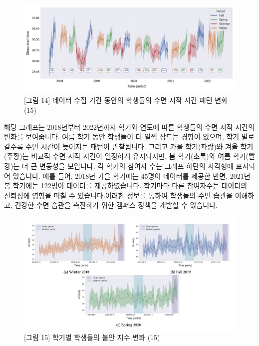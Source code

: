 \documentclass[
  letterpaper,
]{book}
\begin{document}
\begin{figure}[H]

{\centering \includegraphics{img/fig14.png}

}

\caption{{[}그림 14{]} 데이터 수집 기간 동안의 학생들의 수면 시작 시간
패턴 변화 (15)}

\end{figure}%

해당 그래프는 2018년부터 2022년까지 학기와 연도에 따른 학생들의 수면
시작 시간의 변화를 보여줍니다. 여름 학기 동안 학생들이 더 일찍 잠드는
경향이 있으며, 학기 말로 갈수록 수면 시간이 늦어지는 패턴이 관찰됩니다.
그리고 가을 학기(파랑)와 겨울 학기(주황)는 비교적 수면 시작 시간이
일정하게 유지되지만, 봄 학기(초록)와 여름 학기(빨강)는 더 큰 변동성을
보입니다. 각 학기의 참여자 수는 그래프 하단의 사각형에 표시되어
있습니다. 예를 들어, 2018년 가을 학기에는 45명이 데이터를 제공한 반면,
2021년 봄 학기에는 122명이 데이터를 제공하였습니다. 학기마다 다른
참여자수는 데이터의 신뢰성에 영향을 미칠 수 있습니다.이러한 정보를
통하여 학생들의 수면 습관을 이해하고, 건강한 수면 습관을 촉진하기 위한
캠퍼스 정책을 개발할 수 있습니다.

\begin{figure}[H]

{\centering \includegraphics{img/fig15.png}

}

\caption{{[}그림 15{]} 학기별 학생들의 불안 지수 변화 (15)}

\end{figure}%
\end{document}
